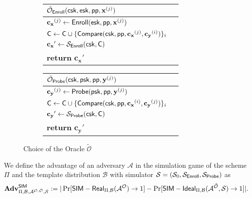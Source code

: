 \begin{figure}[h]
	\begin{center}

		\begin{subfigure}[t]{0.49\textwidth}
		\begin{tabular}{l c}
			$\tilde{\mathcal{O}}_{\sf Enroll}({\sf csk}, {\sf esk}, {\sf pp}, \mathbf{x}^{(j)})$\\

			\hline

			$\mathbf{c_x}^{(j)} \gets {\sf Enroll}({\sf esk}, {\sf pp}, \mathbf{x}^{(j)})$ \\

			${\sf C} \gets {\sf C} \cup \{ {\sf Compare}({\sf csk}, {\sf pp}, \mathbf{c_x}^{(j)}, \mathbf{c_y}^{(i)}) \}_{i}$ \\

			$\mathbf{c_x}' \gets \mathcal{S}_{\sf Enroll}({\sf csk}, {\sf C} )$ \\
			
			\textbf{return} $\mathbf{c_x}'$
			
		\end{tabular}
		\end{subfigure}
		\begin{subfigure}[t]{0.49\textwidth}
		\begin{tabular}{l c}
			$\tilde{\mathcal{O}}_{\sf Probe}({\sf csk}, {\sf psk}, {\sf pp}, \mathbf{y}^{(j)})$\\

			\hline

			$\mathbf{c_y}^{(j)} \gets {\sf Probe}( {\sf psk}, {\sf pp}, \mathbf{y}^{(j)} ) $ \\

			${\sf C} \gets {\sf C} \cup \{ {\sf Compare}({\sf csk}, {\sf pp}, \mathbf{c_x}^{(i)}, \mathbf{c_y}^{(j)}) \}_{i}$ \\

			$\mathbf{c_y}' \gets \mathcal{S}_{\sf Probe}({\sf csk}, {\sf C} )$ \\

			\textbf{return} $\mathbf{c_y}'$
			
		\end{tabular}
		\end{subfigure}
	\end{center}
	\caption{Choice of the Oracle $\tilde{\mathcal{O}}$}
	\label{fig:sim_game_oracle}
\end{figure}


We define the advantage of an adversary $\mathcal{A}$ in the simulation game of the scheme $\Pi$ and the template distribution $\mathcal{B}$ with simulator $\mathcal{S} = (\mathcal{S}_0, \mathcal{S}_{\sf Enroll}, \mathcal{S}_{\sf Probe})$ as
\[
	\mathbf{Adv}^{\sf SIM}_{\Pi, \mathcal{B}, \mathcal{A}^{\mathcal{O}, \tilde{\mathcal{O}}}, \mathcal{S}} := |\Pr[{\sf SIM-Real}_{\Pi, \mathcal{B}}(\mathcal{A}^\mathcal{O}) \to 1] - \Pr[{\sf SIM-Ideal}_{\Pi, \mathcal{B}}(\mathcal{A}^{\tilde{\mathcal{O}}}, \mathcal{S}) \to 1]|.
\]

